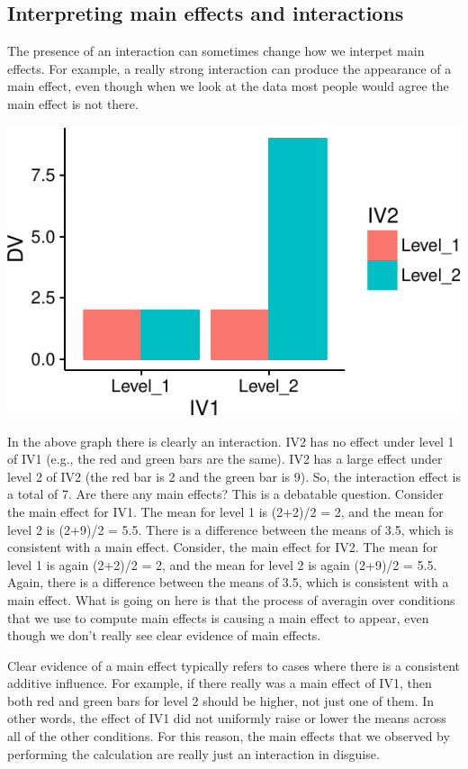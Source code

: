\subsection{Interpreting main effects and
interactions}\label{interpreting-main-effects-and-interactions}

The presence of an interaction can sometimes change how we interpet main
effects. For example, a really strong interaction can produce the
appearance of a main effect, even though when we look at the data most
people would agree the main effect is not there.

\includegraphics{Factorial_files/figure-latex/unnamed-chunk-15-1}

In the above graph there is clearly an interaction. IV2 has no effect
under level 1 of IV1 (e.g., the red and green bars are the same). IV2
has a large effect under level 2 of IV2 (the red bar is 2 and the green
bar is 9). So, the interaction effect is a total of 7. Are there any
main effects? This is a debatable question. Consider the main effect for
IV1. The mean for level 1 is (2+2)/2 = 2, and the mean for level 2 is
(2+9)/2 = 5.5. There is a difference between the means of 3.5, which is
consistent with a main effect. Consider, the main effect for IV2. The
mean for level 1 is again (2+2)/2 = 2, and the mean for level 2 is again
(2+9)/2 = 5.5. Again, there is a difference between the means of 3.5,
which is consistent with a main effect. What is going on here is that
the process of averagin over conditions that we use to compute main
effects is causing a main effect to appear, even though we don't really
see clear evidence of main effects.

Clear evidence of a main effect typically refers to cases where there is
a consistent additive influence. For example, if there really was a main
effect of IV1, then both red and green bars for level 2 should be
higher, not just one of them. In other words, the effect of IV1 did not
uniformly raise or lower the means across all of the other conditions.
For this reason, the main effects that we observed by performing the
calculation are really just an interaction in disguise.

